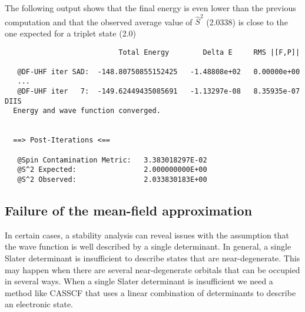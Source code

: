 \documentclass[../Main/chem532-notes.tex]{subfiles}
\begin{document}
The following output shows that the final energy is even lower than the previous computation and that the observed average value of $\hat{S}^2$ (2.0338) is close to the one expected for a triplet state (2.0)
\begin{verbatim}
                           Total Energy        Delta E     RMS |[F,P]|

   @DF-UHF iter SAD:  -148.80750855152425   -1.48808e+02   0.00000e+00
   ...
   @DF-UHF iter   7:  -149.62449435085691   -1.13297e-08   8.35935e-07 DIIS
  Energy and wave function converged.


  ==> Post-Iterations <==

   @Spin Contamination Metric:   3.383018297E-02
   @S^2 Expected:                2.000000000E+00
   @S^2 Observed:                2.033830183E+00
\end{verbatim}

\subsection{Failure of the mean-field approximation}
In certain cases, a stability analysis can reveal issues with the assumption that the wave function is well described by a single determinant.
In general, a single Slater determinant is insufficient to describe states that are near-degenerate. This may happen when there are several near-degenerate orbitals that can be occupied in several ways.
When a single Slater determinant is insufficient we need a method like CASSCF that uses a linear combination of determinants to describe an electronic state.
\end{document}
